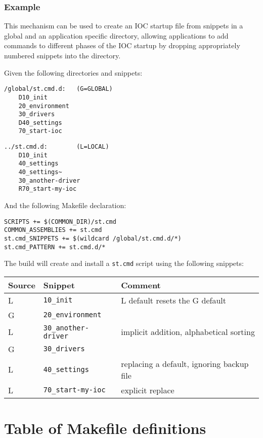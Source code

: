 \subsubsection{Example}
This mechanism can be used to create an IOC startup file from snippets in a global and
an application specific directory, allowing applications to add commands to different phases
of the IOC startup by dropping appropriately numbered snippets into the directory.

Given the following directories and snippets:

\begin{verbatim}
/global/st.cmd.d:   (G=GLOBAL)
    D10_init
    20_environment
    30_drivers
    D40_settings
    70_start-ioc
\end{verbatim}

\begin{verbatim}
../st.cmd.d:        (L=LOCAL)
    D10_init
    40_settings
    40_settings~
    30_another-driver
    R70_start-my-ioc
\end{verbatim}

And the following Makefile declaration:

\begin{verbatim}
SCRIPTS += $(COMMON_DIR)/st.cmd
COMMON_ASSEMBLIES += st.cmd
st.cmd_SNIPPETS += $(wildcard /global/st.cmd.d/*)
st.cmd_PATTERN += st.cmd.d/*
\end{verbatim}

The build will create and install a \verb|st.cmd| script using the following snippets: 

\begin{tabular}{lll}
\textbf{Source} & \textbf{Snippet} & \textbf{Comment} \\ \hline
L & \verb|10_init|            & L default resets the G default \\
G & \verb|20_environment|     & \\
L & \verb|30_another-driver|  & implicit addition, alphabetical sorting \\
G & \verb|30_drivers|         & \\
L & \verb|40_settings|        & replacing a default, ignoring backup file \\
L & \verb|70_start-my-ioc|    & explicit replace \\
\end{tabular}

\section{Table of Makefile definitions}

